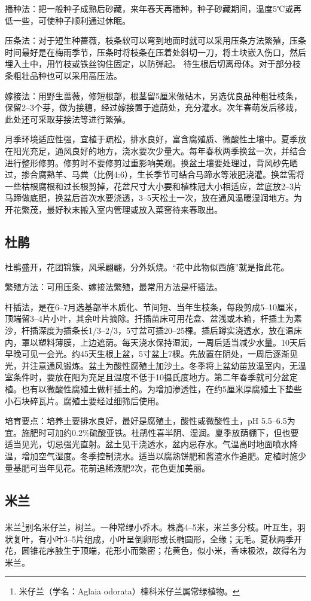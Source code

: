 \documentclass{ctexbook}
\begin{document}
播种法：把一般种子成熟后砂藏，来年春天再播种，种子砂藏期间，温度5℃或再低一些，可使种子顺利通过休眠。

压条法：对于短生种蔷薇，枝条软可以弯到地面时就可以采用压条方法繁殖，压条时间最好是在梅雨季节，压条时将枝条在压着处斜切一刀，将土块嵌入伤口，然后埋入土中，用竹枝或铁丝钩住固定，以防弹起。
待生根后切离母体。对于部分枝条粗壮品种也可以采用高压法。

嫁接法：用野生蔷薇，修短根部，根茎留5厘米做砧木，另选优良品种粗壮枝条，保留2--3个芽，做为接穗，经过嫁接置于遮荫处，充分灌水。次年春萌发后移栽，此处还可采取芽接法等进行繁殖。

月季环境适应性强，宜植于疏松，排水良好，富含腐殖质、微酸性土壤中。夏季放在阳光充足，通风良好的地方，浇水要次少量大。每年春秋两季换盆一次，并结合进行整形修剪。修剪时不要修剪过重影响美观。换盆土壤要处理过，背风砂先晒过，掺合腐熟羊、马粪（比例4:6），生长季节可结合马蹄水等液肥浇灌。换盆需将一些枯根腐根和过长根剪掉，花盆尺寸大小要和植株冠大小相适应，盆底放2--3片马蹄做底肥，换盆后首次水要浇透，3--5天松土一次，放在通风温暖湿润地方。为开花繁茂，最好秋末搬入室内管理或放入菜窖待来春取出。

\subsection{杜鹃}
杜鹃盛开，花团锦簇，风采翩翩，分外妖烧。“花中此物似西施”就是指此花。

繁殖方法：可用压条、嫁接法繁殖，最常用方法是杆插法。

杆插法，是在6--7月选基部半木质化、节间短、当年生枝条，每段剪成5--10厘米，顶端留3--4片小叶，其余叶片摘除。扦插苗床可用花盒、盆浅或木箱，杆插土为素沙，杆插深度为插条长1/3--2/3，5寸盆可插20--25棵。插后蹲实浇透水，放在温床内，罩以塑料薄膜，上边遮荫。每天浇水保持湿润，一周后适当减少水量。10天后早晚可见一会光。约45天生根上盆，5寸盆上7棵。先放置在阴处，一周后逐渐见光，并注意通风锻炼。盆土为酸性腐殖土加沙土。冬季将上盆幼苗放温室内，无温室条件时，要放在阳为充足且温度不低于10摄氏度地方。第二年春季就可分盆定植。也有以微酸性腐殖土做杆插土的。为增加渗透性，在约5厘米厚腐殖土下垫些小石块碎瓦片。腐殖土要经过细筛后使用。

培育要点：培养土要排水良好，最好是腐殖土，酸性或微酸性土，pH 5.5--6.5为宜。施肥时可加约0.2\%硫酸亚铁。杜鹃性喜半阴、湿润。夏季放荫棚下，但也要适当见光，切忌强光直射。盆土见干浇透水，盆内忌存水。气温高时地面喷水降温，增加空气湿度。冬季控制浇水。适当以腐熟饼肥和酱渣水作追肥。定植时施少量基肥可当年见花。花前追稀液肥2次，花色更加美丽。
\subsection{米兰}
米兰\footnote{米仔兰（学名：Aglaia odorata）楝科米仔兰属常绿植物。}别名米仔兰，树兰。一种常绿小乔木。株高4--5米，米兰多分枝。叶互生，羽状复叶，有小叶3--5片组成，小叶呈倒卵形或长椭圆形，全缘；无毛。夏秋两季开花，圆锥花序腋生于顶端，花形小而繁密；花黄色，似小米，香味极浓，故得名为米兰。
\end{document}
